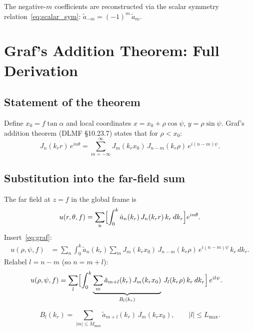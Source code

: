 \documentclass[11pt,a4paper]{article}
\begin{document}
The negative-$m$ coefficients are reconstructed via the scalar symmetry
relation~\eqref{eq:scalar_sym}: $\tilde a_{-m} = (-1)^m\,\tilde a_m$.


\section{Graf's Addition Theorem: Full Derivation}
\label{sec:graf}

\subsection{Statement of the theorem}

Define $x_0 = f\tan\alpha$ and local coordinates
$x = x_0+\rho\cos\psi$, $y = \rho\sin\psi$.
Graf's addition theorem (DLMF \S10.23.7) states that for $\rho < x_0$:
\begin{equation}\label{eq:graf}
  J_n(k_r r)\,e^{in\theta}
  = \sum_{m=-\infty}^{\infty} J_m(k_r x_0)\,J_{n-m}(k_r\rho)\,e^{i(n-m)\psi}.
\end{equation}

\subsection{Substitution into the far-field sum}

The far field at $z=f$ in the global frame is
\begin{equation}
  u(r,\theta,f) = \sum_n\Bigl[\int_0^k \tilde a_n(k_r)\,J_n(k_r r)\,k_r\,dk_r\Bigr]e^{in\theta}.
\end{equation}
Insert~\eqref{eq:graf}:
\begin{align}
  u(\rho,\psi,f)
  &= \sum_n\int_0^k \tilde a_n(k_r)\sum_m J_m(k_r x_0)\,J_{n-m}(k_r\rho)\,e^{i(n-m)\psi}\,k_r\,dk_r.
\end{align}
Relabel $l = n - m$ (so $n = m + l$):
\begin{align}
  u(\rho,\psi,f)
  &= \sum_l\Bigl[\int_0^k
    \underbrace{\sum_m \tilde a_{m+l}(k_r)\,J_m(k_r x_0)}_{B_l(k_r)}
    \,J_l(k_r\rho)\,k_r\,dk_r\Bigr]\,e^{il\psi}.
\end{align}

\begin{tcolorbox}[title=Local modal coefficients (Graf shift)]
\begin{equation}\label{eq:Bl}
  B_l(k_r) = \sum_{|m|\le M_{\max}} \tilde a_{m+l}(k_r)\,J_m(k_r x_0),
  \qquad |l| \le L_{\max}.
\end{equation}
\end{tcolorbox}
\end{document}
